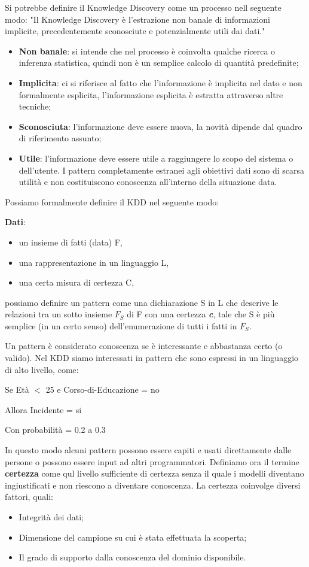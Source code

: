 \documentclass[a4paper]{extarticle}
\begin{document}
Si potrebbe definire il Knowledge Discovery come un processo nell seguente modo: "Il Knowledge Discovery è l'estrazione non banale di informazioni implicite, precedentemente sconosciute e potenzialmente utili dai dati."
\begin{itemize}
    \item \textbf{Non banale}: si intende che nel processo è coinvolta qualche ricerca o inferenza statistica, quindi non è un semplice calcolo di quantità predefinite;
    \item \textbf{Implicita}: ci si riferisce al fatto che l'informazione è implicita nel dato e non formalmente esplicita, l'informazione esplicita è estratta attraverso altre tecniche;
    \item \textbf{Sconosciuta}: l'informazione deve essere nuova, la novità dipende dal quadro di riferimento assunto;
    \item \textbf{Utile}: l'informazione deve essere utile a raggiungere lo scopo del sistema o dell'utente. I pattern completamente estranei agli obiettivi dati sono di scarsa utilità e non costituiscono conoscenza all'interno della situazione data.
\end{itemize}

Possiamo formalmente definire il KDD nel seguente modo:

\textbf{Dati}:
\begin{itemize}
	\item un insieme di fatti (data) F,
	\item una rappresentazione in un linguaggio L,
	\item una certa misura di certezza C,
\end{itemize}
possiamo definire un pattern come una dichiarazione S in L che descrive le relazioni tra un sotto insieme $F_{S}$ di F con una certezza \textbf{\textit{c}}, tale che S è più semplice (in un certo senso) dell'enumerazione di tutti i fatti in $F_S$.

Un pattern è considerato conoscenza se è interessante e abbastanza certo (o valido). Nel KDD siamo interessati in pattern che sono espressi in un linguaggio di alto livello, come:
\newpage
\begin{center}
Se Età $<$ 25 e Corso-di-Educazione = no

Allora Incidente = si

Con probabilità = 0.2 a 0.3
\end{center}
In questo modo alcuni pattern possono essere capiti e usati direttamente dalle persone o possono essere input ad altri programmatori.
Definiamo ora il termine \textbf{certezza} come qul livello sufficiente di certezza senza il quale i modelli diventano ingiustificati e non riescono a diventare conoscenza. La certezza coinvolge diversi fattori, quali: 
\begin{itemize}
	\item Integrità dei dati;
	\item Dimensione del campione su cui è stata effettuata la scoperta;
	\item Il grado di supporto dalla conoscenza del dominio disponibile.
\end{itemize}
\end{document}
